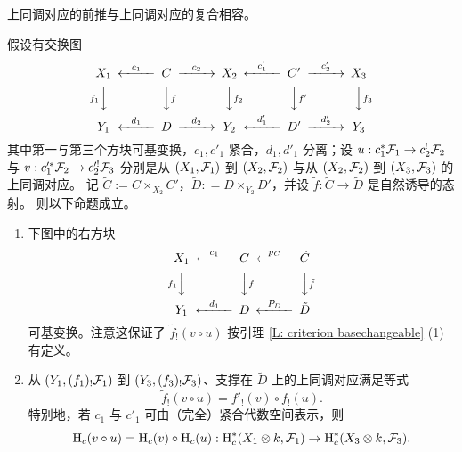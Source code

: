 上同调对应的前推与上同调对应的复合相容。
\begin{lem}
\label{AL:pushforward compatible with composition}
假设有交换图
\[
\begin{CD}
X_1@<c_1<< C@>c_2>> X_2@<c'_1<< C'@>c'_2>> X_3\\
@Vf_1VV@VVfV@VVf_2V@VVf'V@VVf_3V\\
Y_1@<d_1<<D@>d_2>>Y_2@<d'_1<<D'@>d'_2>>Y_3
\end{CD}
\]
其中第一与第三个方块可基变换，$c_1,  c'_1$ 紧合，$d_1,d'_1$ 分离；设 $u: c_1^*\mathcal{F}_1 \to c_2^!\mathcal{F}_2$ 与 $v: c'^*_1\mathcal{F}_2 \to c'^!_2 \mathcal{F}_3$ 分别是从 $(X_1, \mathcal{F}_1)$ 到 $(X_2, \mathcal{F}_2)$ 与从 $(X_2, \mathcal{F}_2)$ 到 $(X_3, \mathcal{F}_3)$ 的上同调对应。
记 $\widetilde C := C \times_{X_2} C'$，$\widetilde D: = D \times_{Y_2} D'$，并设 $\tilde f: \widetilde C \to \widetilde D$ 是自然诱导的态射。
则以下命题成立。
\begin{enumerate}
\item 下图中的右方块
\[\begin{CD}
X_1@<c_1<<C@<p_C<<\tilde C \\
@Vf_1VV@VVfV@VV\tilde fV\\
Y_1@<d_1<<D@<P_D<<\tilde D
\end{CD}\]
可基变换。注意这保证了 $\tilde f_!(v \circ u)$ 按引理 \ref{L: criterion basechangeable} (1) 有定义。
\item 从 $(Y_1, (f_1)_!\mathcal{F}_1)$ 到 $(Y_3, (f_3)_!\mathcal{F}_3)$、支撑在 $\widetilde D$ 上的上同调对应满足等式
\[
\tilde f_!(v\circ u) = f'_!(v) \circ f_!(u).
\]
特别地，若 $c_1$ 与 $c'_1$ 可由（完全）紧合代数空间表示，则
$$\operatorname{H}_c(v\circ u) = \operatorname{H}_c(v) \circ \operatorname{H}_c(u):\operatorname{H}^*_c(X_1\otimes\bar k, \mathcal{F}_1) \to \operatorname{H}^*_c(X_3\otimes \bar k, \mathcal{F}_3).$$
\end{enumerate}
\end{lem}

